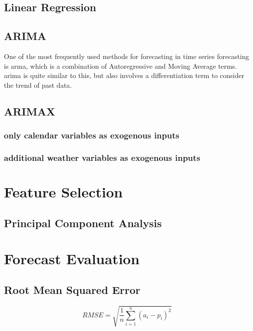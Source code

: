 \subsection{Linear Regression}


\subsection{ARIMA}

One of the most frequently used methods for forecasting in time series forecasting is \gls{arma}, which is a combination of Autoregressive and Moving Average terms. \gls{arima} is quite similar to this, but also involves a differentiation term to consider the trend of past data.\\

\subsection{ARIMAX}

\subsubsection{only calendar variables as exogenous inputs}

\subsubsection{additional weather variables as exogenous inputs}

\section{Feature Selection}
\label{sec:featsel}

\subsection{Principal Component Analysis}

\section{Forecast Evaluation}
\label{sec:fceval}

\subsection{Root Mean Squared Error}

\begin{equation}
RMSE = \sqrt{\frac{1}{n} \sum_{i=1}^{n} (a_i-p_i)^2}
\end{equation}

